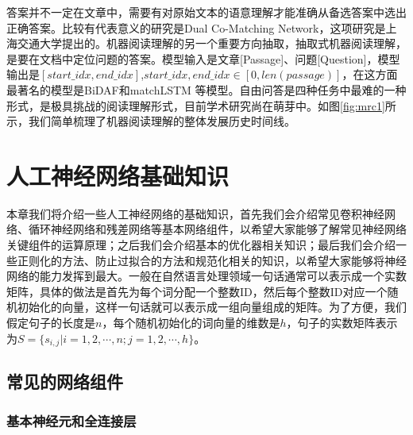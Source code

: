\documentclass[twoside,a4paper,12pt]{book}%
\begin{document}
答案并不一定在文章中，需要有对原始文本的语意理解才能准确从备选答案中选出正确答案。比较有代表意义的研究是Dual Co-Matching Network，这项研究是上海交通大学提出的。机器阅读理解的另一个重要方向抽取，抽取式机器阅读理解，是要在文档中定位问题的答案。模型输入是文章[Passage]、问题[Question]，模型输出是$[start\_idx,end\_idx]$,$ start\_idx,end\_idx \in [ 0, len(passage) ]$，在这方面最著名的模型是BiDAF和matchLSTM 等模型。自由问答是四种任务中最难的一种形式，是极具挑战的阅读理解形式，目前学术研究尚在萌芽中。如图\ref{fig:mrc1}所示，我们简单梳理了机器阅读理解的整体发展历史时间线。


\chapter{人工神经网络基础知识}
本章我们将介绍一些人工神经网络的基础知识，首先我们会介绍常见卷积神经网络、循环神经网络和残差网络等基本网络组件，以希望大家能够了解常见神经网络关键组件的运算原理；之后我们会介绍基本的优化器相关知识；最后我们会介绍一些正则化的方法、防止过拟合的方法和规范化相关的知识，以希望大家能够将神经网络的能力发挥到最大。一般在自然语言处理领域一句话通常可以表示成一个实数矩阵，具体的做法是首先为每个词分配一个整数ID，然后每个整数ID对应一个随机初始化的向量，这样一句话就可以表示成一组向量组成的矩阵。为了方便，我们假定句子的长度是$n$，每个随机初始化的词向量的维数是$h$，句子的实数矩阵表示为$S=\{s_{i,j}|i=1,2,\cdots,n;j=1,2,\cdots,h\} $。

\section{常见的网络组件}
\subsection{基本神经元和全连接层}
\end{document}

